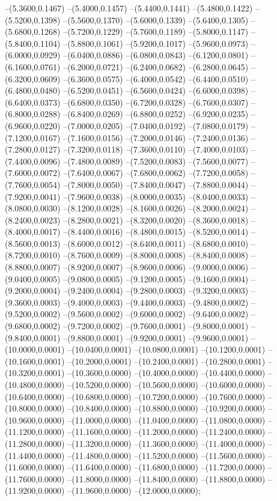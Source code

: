 {	--(5.3600,0.1467)
	--(5.4000,0.1457)
	--(5.4400,0.1441)
	--(5.4800,0.1422)
	--(5.5200,0.1398)
	--(5.5600,0.1370)
	--(5.6000,0.1339)
	--(5.6400,0.1305)
	--(5.6800,0.1268)
	--(5.7200,0.1229)
	--(5.7600,0.1189)
	--(5.8000,0.1147)
	--(5.8400,0.1104)
	--(5.8800,0.1061)
	--(5.9200,0.1017)
	--(5.9600,0.0973)
	--(6.0000,0.0929)
	--(6.0400,0.0886)
	--(6.0800,0.0843)
	--(6.1200,0.0801)
	--(6.1600,0.0761)
	--(6.2000,0.0721)
	--(6.2400,0.0682)
	--(6.2800,0.0645)
	--(6.3200,0.0609)
	--(6.3600,0.0575)
	--(6.4000,0.0542)
	--(6.4400,0.0510)
	--(6.4800,0.0480)
	--(6.5200,0.0451)
	--(6.5600,0.0424)
	--(6.6000,0.0398)
	--(6.6400,0.0373)
	--(6.6800,0.0350)
	--(6.7200,0.0328)
	--(6.7600,0.0307)
	--(6.8000,0.0288)
	--(6.8400,0.0269)
	--(6.8800,0.0252)
	--(6.9200,0.0235)
	--(6.9600,0.0220)
	--(7.0000,0.0205)
	--(7.0400,0.0192)
	--(7.0800,0.0179)
	--(7.1200,0.0167)
	--(7.1600,0.0156)
	--(7.2000,0.0146)
	--(7.2400,0.0136)
	--(7.2800,0.0127)
	--(7.3200,0.0118)
	--(7.3600,0.0110)
	--(7.4000,0.0103)
	--(7.4400,0.0096)
	--(7.4800,0.0089)
	--(7.5200,0.0083)
	--(7.5600,0.0077)
	--(7.6000,0.0072)
	--(7.6400,0.0067)
	--(7.6800,0.0062)
	--(7.7200,0.0058)
	--(7.7600,0.0054)
	--(7.8000,0.0050)
	--(7.8400,0.0047)
	--(7.8800,0.0044)
	--(7.9200,0.0041)
	--(7.9600,0.0038)
	--(8.0000,0.0035)
	--(8.0400,0.0033)
	--(8.0800,0.0030)
	--(8.1200,0.0028)
	--(8.1600,0.0026)
	--(8.2000,0.0024)
	--(8.2400,0.0023)
	--(8.2800,0.0021)
	--(8.3200,0.0020)
	--(8.3600,0.0018)
	--(8.4000,0.0017)
	--(8.4400,0.0016)
	--(8.4800,0.0015)
	--(8.5200,0.0014)
	--(8.5600,0.0013)
	--(8.6000,0.0012)
	--(8.6400,0.0011)
	--(8.6800,0.0010)
	--(8.7200,0.0010)
	--(8.7600,0.0009)
	--(8.8000,0.0008)
	--(8.8400,0.0008)
	--(8.8800,0.0007)
	--(8.9200,0.0007)
	--(8.9600,0.0006)
	--(9.0000,0.0006)
	--(9.0400,0.0005)
	--(9.0800,0.0005)
	--(9.1200,0.0005)
	--(9.1600,0.0004)
	--(9.2000,0.0004)
	--(9.2400,0.0004)
	--(9.2800,0.0003)
	--(9.3200,0.0003)
	--(9.3600,0.0003)
	--(9.4000,0.0003)
	--(9.4400,0.0003)
	--(9.4800,0.0002)
	--(9.5200,0.0002)
	--(9.5600,0.0002)
	--(9.6000,0.0002)
	--(9.6400,0.0002)
	--(9.6800,0.0002)
	--(9.7200,0.0002)
	--(9.7600,0.0001)
	--(9.8000,0.0001)
	--(9.8400,0.0001)
	--(9.8800,0.0001)
	--(9.9200,0.0001)
	--(9.9600,0.0001)
	--(10.0000,0.0001)
	--(10.0400,0.0001)
	--(10.0800,0.0001)
	--(10.1200,0.0001)
	--(10.1600,0.0001)
	--(10.2000,0.0001)
	--(10.2400,0.0001)
	--(10.2800,0.0001)
	--(10.3200,0.0001)
	--(10.3600,0.0000)
	--(10.4000,0.0000)
	--(10.4400,0.0000)
	--(10.4800,0.0000)
	--(10.5200,0.0000)
	--(10.5600,0.0000)
	--(10.6000,0.0000)
	--(10.6400,0.0000)
	--(10.6800,0.0000)
	--(10.7200,0.0000)
	--(10.7600,0.0000)
	--(10.8000,0.0000)
	--(10.8400,0.0000)
	--(10.8800,0.0000)
	--(10.9200,0.0000)
	--(10.9600,0.0000)
	--(11.0000,0.0000)
	--(11.0400,0.0000)
	--(11.0800,0.0000)
	--(11.1200,0.0000)
	--(11.1600,0.0000)
	--(11.2000,0.0000)
	--(11.2400,0.0000)
	--(11.2800,0.0000)
	--(11.3200,0.0000)
	--(11.3600,0.0000)
	--(11.4000,0.0000)
	--(11.4400,0.0000)
	--(11.4800,0.0000)
	--(11.5200,0.0000)
	--(11.5600,0.0000)
	--(11.6000,0.0000)
	--(11.6400,0.0000)
	--(11.6800,0.0000)
	--(11.7200,0.0000)
	--(11.7600,0.0000)
	--(11.8000,0.0000)
	--(11.8400,0.0000)
	--(11.8800,0.0000)
	--(11.9200,0.0000)
	--(11.9600,0.0000)
	--(12.0000,0.0000);
}
